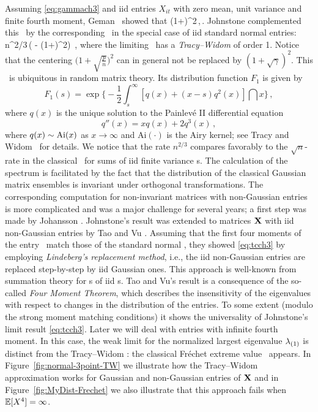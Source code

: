Assuming \eqref{eq:gammach3} and iid entries $X_{it}$ with zero mean, unit variance and finite fourth moment,  Geman~\cite{geman}
showed that
\beam\label{eq:gemanch3}
 \stas \big(1+\sqrt{\gamma}\big)^2\,,\qquad \nto\,.
\eeam
Johnstone \cite{johnstone:2001} complemented this \slln\ by the corresponding \clt\ in the special case of iid standard normal
entries:
\beam\label{eq:tcch3}
 n^{2/3}\,\Big( -
\big(1+\big)^2\Big)
\,,
\eeam
where the limiting \rv\ has a {\em Tracy--Widom \ds} of order 1. Notice that the centering
$\big(1+\sqrt{\tfrac pn }\big)^2$ can in general not be replaced by $(1+\sqrt{\gamma})^2$.
This \ds\ is ubiquitous in random matrix theory.
Its distribution function $F_1$ is given by
\begin{equation*}
F_1(s) = \exp\Big\{
  -\frac{1}{2} \int_{s}^\infty [
    q(x) + (x - s) q^2(x)
 ] \dint x
\Big\}\,,
\end{equation*}
where $q(x)$ is the unique solution to the Painlev\'e II differential
equation
\begin{equation*}
  q''(x) = xq(x) + 2 q^3(x)\,,
\end{equation*}
where $ q(x)\sim {\rm Ai}(x)$ as $x \to \infty$ and Ai$(\cdot)$ is the Airy kernel; see Tracy and Widom~\cite{tracy:widom:2012} for details.
We notice that the rate $n^{2/3}$ compares favorably to the $\sqrt{n}$-rate in the classical \clt\ for sums
of iid finite variance \rv s.
The calculation of the spectrum is facilitated by the fact that the distribution of
the classical Gaussian matrix ensembles is invariant under orthogonal transformations. The corresponding
computation for non-invariant matrices with non-Gaussian entries is more complicated and was a major challenge for several years; a first step was made by Johansson \cite{johansson}.
Johnstone's result was extended to matrices ${\mathbf X}$ with iid non-Gaussian entries
by Tao and Vu \cite[Theorem~1.16]{tao09b}. Assuming that the first four moments of the entry \ds\ match  those of
the standard normal \ds , they showed \eqref{eq:tcch3} by
employing {\em Lindeberg's replacement method}, i.e., the iid non-Gaussian entries are replaced
step-by-step by iid Gaussian ones.
This approach is well-known from summation theory for \seq s of iid \rv s. Tao and Vu's result is a consequence of the so-called {\em Four Moment Theorem}, which describes the insensitivity of the eigenvalues with respect to changes in the distribution of the entries. To some extent (modulo the strong moment matching conditions) it shows the universality of Johnstone's limit
result \eqref{eq:tcch3}. Later we will deal with entries with infinite fourth moment. In this case, the weak limit
for the normalized largest eigenvalue $\lambda_{(1)}$ is distinct from the Tracy--Widom \ds : the classical Fr\'echet extreme value
\ds\ appears.
In Figure~\ref{fig:normal-3point-TW} we illustrate how the Tracy--Widom approximation works for Gaussian and non-Gaussian entries of ${\mathbf X}$
and in Figure~\ref{fig:MyDist-Frechet} we also illustrate that this approach fails when $\mathbb{E}[X^4]=\infty$.


